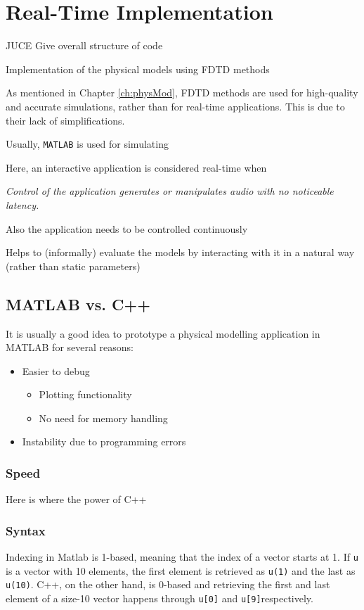\chapter{Real-Time Implementation}
JUCE
Give overall structure of code


Implementation of the physical models
using FDTD methods

As mentioned in Chapter \ref{ch:physMod}, FDTD methods are used for high-quality and accurate simulations, rather than for real-time applications. This is due to their lack of simplifications.

Usually, \texttt{MATLAB} is used for simulating 

Here, an interactive application is considered real-time when
\begin{center}\it
    Control of the application generates or manipulates audio with no noticeable latency.
\end{center}

Also the application needs to be controlled continuously

Helps to (informally) evaluate the models by interacting with it in a natural way (rather than static parameters)

\section{MATLAB vs. C++}
It is usually a good idea to prototype a physical modelling application in MATLAB for several reasons:
\begin{itemize}
    \item Easier to debug
    \begin{itemize}
        \item Plotting functionality
        \item No need for memory handling
    \end{itemize}
    \item Instability due to programming errors 
\end{itemize}

\subsection{Speed}
Here is where the power of C++ 



\subsection{Syntax}
Indexing in
Matlab is 1-based, meaning that the index of a vector starts at 1. If \texttt{u} is a vector with 10 elements, the first element is retrieved as \texttt{u(1)} and the last as \texttt{u(10)}. C++, on the other hand, is 0-based and retrieving the first and last element of a size-10 vector happens through \texttt{u[0]} and \texttt{u[9]}respectively. 

